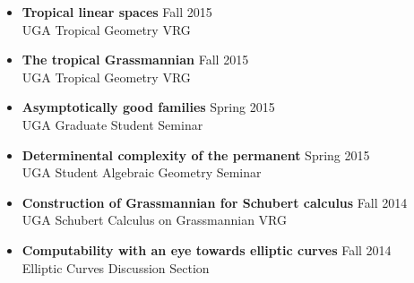 \documentclass[letterpaper,11pt]{article}
\begin{document}
\begin{itemize}
 \item \textbf{Tropical linear spaces} \hfill Fall 2015 \\
       UGA Tropical Geometry VRG
 \item \textbf{The tropical Grassmannian} \hfill Fall 2015 \\
       UGA Tropical Geometry VRG
 \item \textbf{Asymptotically good families} \hfill Spring 2015 \\
       UGA Graduate Student Seminar
 \item \textbf{Determinental complexity of the permanent} \hfill Spring 2015 \\
       UGA Student Algebraic Geometry Seminar
 \item \textbf{Construction of Grassmannian for Schubert calculus} \hfill Fall 2014 \\
       UGA Schubert Calculus on Grassmannian VRG 
 \item \textbf{Computability with an eye towards elliptic curves} \hfill Fall 2014 \\
       Elliptic Curves Discussion Section
\end{itemize}
\end{document}
